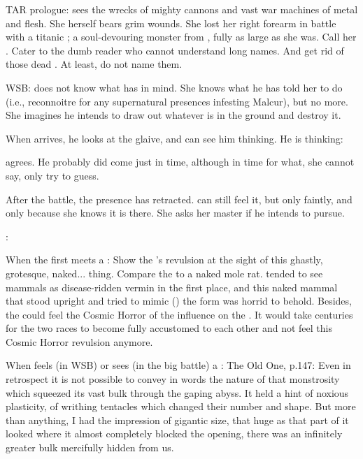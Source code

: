TAR prologue:
  \Nzessuacrith sees the wrecks of mighty cannons and vast war machines of metal and flesh. 
  She herself bears grim wounds. 
  She lost her right forearm in battle with a titanic \umbra; a soul-devouring monster from \Erebos, fully as large as she was.
  Call her .
  Cater to the dumb reader who cannot understand long names. 
  And get rid of those dead \dragons. At least, do not name them.  


WSB: 
  \Criseis does not know what \Ishnaruchaefir has in mind. 
  She knows what he has told her to do (i.e., reconnoitre for any supernatural presences infesting Malcur), but no more.
  She imagines he intends to draw out whatever is in the ground and destroy it.
  
  When \Teshrial arrives, he looks at the glaive, and \Criseis can see him thinking. 
  He is thinking: 
    
  \Criseis agrees. He probably did come just in time, although in time for what, she cannot say, only try to guess. 
  
  After the battle, the \noggyal presence has retracted. 
  \Criseis can still feel it, but only faintly, and only because she knows it is there.
  She asks her master if he intends to pursue.
  
  \Ishnaruchaefir:


When the first \scatha meets a \human: 
Show the \scatha's revulsion at the sight of this ghastly, grotesque, naked... thing. 
Compare the \human to a naked mole rat. 
\Scathae tended to see mammals as disease-ridden vermin in the first place, and this naked mammal that stood upright and tried to mimic () the \scathaese form was horrid to behold. 
Besides, the \scatha could feel the Cosmic Horror of the \pps{\banes} influence on the \human. 
It would take centuries for the two races to become fully accustomed to each other and not feel this Cosmic Horror revulsion anymore. 


When \Criseis feels (in WSB) or sees (in the big battle) a \noggyal:
The Old One, p.147:
  Even in retrospect it is not possible to convey in words the nature of that monstrosity which squeezed its vast bulk through the gaping abyss.
  It held a hint of noxious plasticity, of writhing tentacles which changed their number and shape.
  But more than anything, I had the impression of gigantic size, that huge as that part of it looked where it almost completely blocked the opening, there was an infinitely greater bulk mercifully hidden from us.
  
